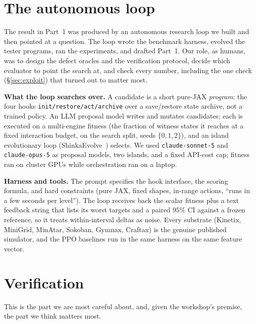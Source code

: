 
\section{The autonomous loop}
\label{sec:system}
The result in Part~1 was produced by an autonomous research loop we built and then pointed at a question. The loop wrote
the benchmark harness, evolved the tester programs, ran the experiments, and drafted Part~1. Our role, as humans, was to
design the defect oracles and the verification protocol, decide which evaluator to point the search at, and check every
number, including the one check (\S\ref{sec:exploit}) that turned out to matter most.

\textbf{What the loop searches over.} A candidate is a short pure-JAX \emph{program}: the four hooks
\texttt{init/restore/act/archive} over a save/restore state archive, not a trained policy. An LLM proposal model writes and
mutates candidates; each is executed on a multi-engine fitness (the fraction of witness states it reaches at a fixed
interaction budget, on the search split, seeds $\{0,1,2\}$), and an island evolutionary loop
(ShinkaEvolve~\citep{shinkaevolve}) selects. We used \texttt{claude-sonnet-5} and \texttt{claude-opus-5} as proposal
models, two islands, and a fixed API-cost cap; fitness ran on cluster GPUs while orchestration ran on a laptop.

\textbf{Harness and tools.} The prompt specifies the hook interface, the scoring formula, and hard constraints (pure JAX,
fixed shapes, in-range actions, ``runs in a few seconds per level''). The loop receives back the scalar fitness plus a text
feedback string that lists its worst targets and a paired $95\%$ CI against a frozen reference, so it treats
within-interval deltas as noise. Every substrate (Kinetix, MiniGrid, MinAtar, Sokoban, Gymnax, Craftax) is the genuine
published simulator, and the PPO baselines run in the same harness on the same feature vector.

\section{Verification}
\label{sec:verify}
This is the part we are most careful about, and, given the workshop's premise, the part we think matters most.

